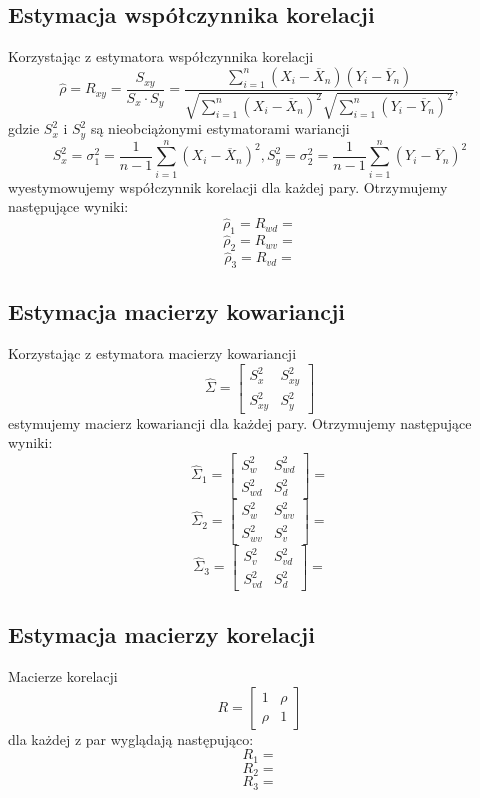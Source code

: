 \documentclass[a4paper,11pt]{article}
\begin{document}
\subsection{Estymacja współczynnika korelacji}
Korzystając z estymatora współczynnika korelacji
$$\hat{\rho}=R_{xy}=\frac{S_{xy}}{S_x\cdot S_y}=\frac{\sum_{i=1}^{n}(X_i-\overline{X}_n)(Y_i-\overline{Y}_n)}{\sqrt{\sum_{i=1}^{n}(X_i-\overline{X}_n)^{2}}\sqrt{\sum_{i=1}^{n}(Y_i-\overline{Y}_n)^{2}}},$$
gdzie $S_x^{2}$ i $S_y^{2}$ są nieobciążonymi estymatorami wariancji
$$S^2_x=\sigma_1^2=\frac{1}{n-1}\sum_{i=1}^{n}(X_i-\overline{X}_n)^2, S^2_y=\sigma_2^2=\frac{1}{n-1}\sum_{i=1}^{n}(Y_i-\overline{Y}_n)^2$$ 
wyestymowujemy współczynnik korelacji dla każdej pary. Otrzymujemy następujące wyniki:
$$\hat{\rho}_1=R_{wd}=$$
$$\hat{\rho}_2=R_{wv}=$$
$$\hat{\rho}_3=R_{vd}=$$

\subsection{Estymacja macierzy kowariancji}
Korzystając z estymatora macierzy kowariancji
$$
\hat{\Sigma}=
\begin{bmatrix}
    S^2_x & S^2_{xy} \\
    S^2_{xy} & S^2_y
\end{bmatrix}
$$
estymujemy macierz kowariancji dla każdej pary. Otrzymujemy następujące wyniki:
$$
\hat{\Sigma}_1=
\begin{bmatrix}
    S^2_w & S^2_{wd} \\
    S^2_{wd} & S^2_d
\end{bmatrix}
=
$$
$$
\hat{\Sigma}_2=
\begin{bmatrix}
    S^2_w & S^2_{wv} \\
    S^2_{wv} & S^2_v
\end{bmatrix}
=
$$
$$
\hat{\Sigma}_3=
\begin{bmatrix}
    S^2_v & S^2_{vd} \\
    S^2_{vd} & S^2_d
\end{bmatrix}
=
$$

\subsection{Estymacja macierzy korelacji}
Macierze korelacji
$$R=
\begin{bmatrix}
    1 & \rho \\
    \rho & 1 
\end{bmatrix}$$
dla każdej z par wyglądają następująco:
$$R_1=$$
$$R_2=$$
$$R_3=$$
\end{document}
